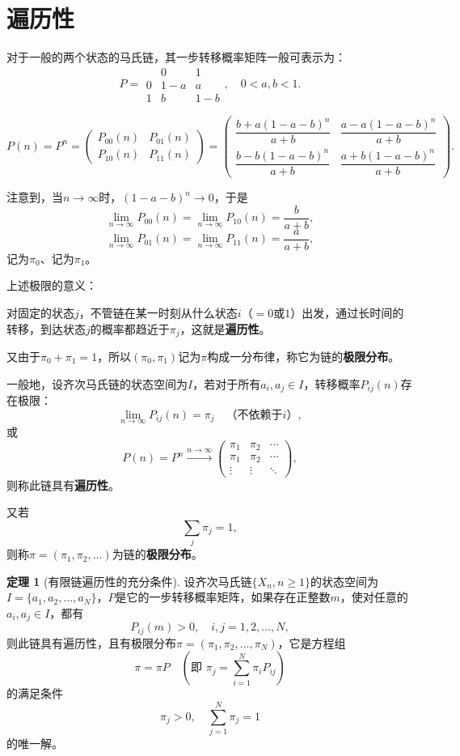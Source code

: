\documentclass[11pt,a4paper]{report}
\theoremstyle{definition}
\newtheorem{theorem}{定理}[chapter]
\begin{document}
\section{遍历性}

对于一般的两个状态的马氏链，其一步转移概率矩阵一般可表示为：
\[
P=
\begin{matrix}
 & 0 & 1\\
0 & 1-a & a\\
1 & b & 1-b
\end{matrix},
\quad 0<a,b<1.
\]

\[
P(n)=P^n=
\begin{pmatrix}
P_{00}(n) & P_{01}(n)\\
P_{10}(n) & P_{11}(n)
\end{pmatrix}
=
\begin{pmatrix}
\dfrac{b+a(1-a-b)^n}{a+b} & \dfrac{a-a(1-a-b)^n}{a+b}\\[1em]
\dfrac{b-b(1-a-b)^n}{a+b} & \dfrac{a+b(1-a-b)^n}{a+b}
\end{pmatrix}.
\]

注意到，当$n\to\infty$时，$(1-a-b)^n\to0$，于是
\[
\lim_{n\to\infty}P_{00}(n)=\lim_{n\to\infty}P_{10}(n)=\frac{b}{a+b},
\]
\[
\lim_{n\to\infty}P_{01}(n)=\lim_{n\to\infty}P_{11}(n)=\frac{a}{a+b},
\]
记为$\pi_0$、记为$\pi_1$。

上述极限的意义：

对固定的状态$j$，不管链在某一时刻从什么状态$i$（$=0$或$1$）出发，通过长时间的转移，到达状态$j$的概率都趋近于$\pi_j$，这就是\textbf{遍历性}。

又由于$\pi_0+\pi_1=1$，所以$(\pi_0,\pi_1)$记为$\pi$构成一分布律，称它为链的\textbf{极限分布}。

一般地，设齐次马氏链的状态空间为$I$，若对于所有$a_i,a_j\in I$，转移概率$P_{ij}(n)$存在极限：
\[
\lim_{n\to\infty}P_{ij}(n)=\pi_j\quad\text{（不依赖于$i$）},
\]
或
\[
P(n)=P^n\xrightarrow{n\to\infty}
\begin{pmatrix}
\pi_1 & \pi_2 & \cdots\\
\pi_1 & \pi_2 & \cdots\\
\vdots & \vdots & \ddots
\end{pmatrix},
\]
则称此链具有\textbf{遍历性}。

又若
\[
\sum_j\pi_j=1,
\]
则称$\pi=(\pi_1,\pi_2,\ldots)$为链的\textbf{极限分布}。

\begin{theorem}[有限链遍历性的充分条件]
设齐次马氏链$\{X_n,n\geq1\}$的状态空间为$I=\{a_1,a_2,\ldots,a_N\}$，$P$是它的一步转移概率矩阵，如果存在正整数$m$，使对任意的$a_i,a_j\in I$，都有
\[
P_{ij}(m)>0,\quad i,j=1,2,\ldots,N,
\]
则此链具有遍历性，且有极限分布$\pi=(\pi_1,\pi_2,\ldots,\pi_N)$，它是方程组
\[
\pi=\pi P\quad\left(\text{即 }\pi_j=\sum_{i=1}^{N}\pi_iP_{ij}\right)
\]
的满足条件
\[
\pi_j>0,\quad \sum_{j=1}^{N}\pi_j=1
\]
的唯一解。
\end{theorem}
\end{document}
